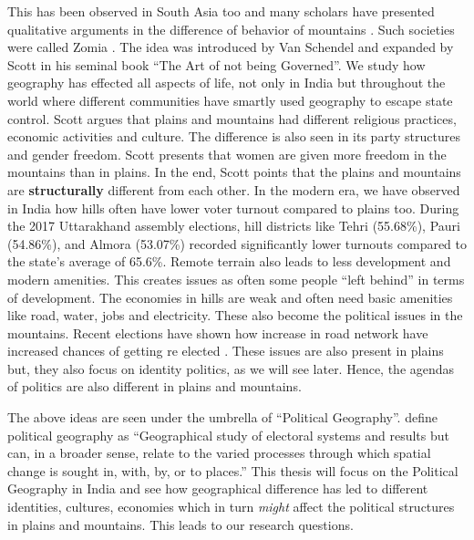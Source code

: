 This has been observed in South Asia too and many scholars have presented qualitative arguments in the difference of behavior of mountains \citep{ali2019delusional,murton2013himalayan,alam2008becoming,hussain2015remoteness}. Such societies were called Zomia \citep{van2005geographies}. The idea was introduced by Van Schendel and expanded by Scott in his seminal book ``The Art of not being Governed''. We study how geography has effected all aspects of life, not only in India but throughout the world where different communities have smartly used geography to escape state control. Scott argues that plains and mountains had different religious practices, economic activities and culture. The difference is also seen in its party structures and gender freedom. Scott presents that women are given more freedom in the mountains than in plains. In the end, Scott points that the plains and mountains are \textbf{structurally} different from each other.  In the modern era, we have observed in India how hills often have lower voter turnout compared to plains too. During the 2017 Uttarakhand assembly elections, hill districts like Tehri (55.68\%), Pauri (54.86\%), and Almora (53.07\%) recorded significantly lower turnouts compared to the state's average of 65.6\%. Remote terrain also leads to less development and modern amenities. This creates issues as often some people ``left behind'' in terms of development. The economies in hills are weak and often need basic amenities like road, water, jobs and electricity. These also become the political issues in the mountains. Recent elections have shown how increase in road network have increased chances of getting re elected \citep{basistha2024elections}. These issues are also present in plains but, they also focus on identity politics, as we will see later. Hence, the agendas of politics are also different in plains and mountains.

\vspace{0.3cm}

The above ideas are seen under the umbrella of ``Political Geography''. \cite{kitchin2009international} define political geography as ``Geographical study of electoral systems and results but can, in a broader sense, relate to the varied processes through which spatial change is sought in, with, by, or to places.'' This thesis will focus on the Political Geography in India and see how geographical difference has led to different identities, cultures, economies which in turn \textit{might} affect the political structures in plains and mountains. This leads to our research questions.

